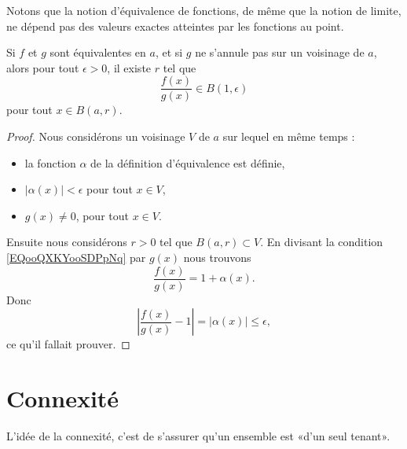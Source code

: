 Notons que la notion d'équivalence de fonctions, de même que la notion de limite, ne dépend pas des valeurs exactes atteintes par les fonctions au point.

\begin{lemma}
    Si \( f\) et \( g\) sont équivalentes en \( a\), et si \( g\) ne s'annule pas sur un voisinage de \( a\), alors pour tout \( \epsilon>0\), il existe \( r\) tel que
    \begin{equation}
        \frac{ f(x) }{ g(x) }\in B(1,\epsilon)
    \end{equation}
    pour tout \( x\in B(a,r)\).
\end{lemma}

\begin{proof}
    Nous considérons un voisinage \( V\) de \( a\) sur lequel en même temps :
    \begin{itemize}
        \item 
            la fonction \( \alpha\) de la définition d'équivalence est définie,
        \item
            \( | \alpha(x) |<\epsilon\) pour tout \( x\in V\),
        \item
            \( g(x)\neq 0\), pour tout \( x\in V\).
    \end{itemize}
    Ensuite nous considérons \( r>0\) tel que \( B(a,r)\subset V\). En divisant la condition \eqref{EQooQXKYooSDPpNq} par \( g(x)\) nous trouvons
    \begin{equation}
        \frac{ f(x) }{ g(x) }=1+\alpha(x).
    \end{equation}
    Donc
    \begin{equation}
        | \frac{ f(x) }{ g(x) }-1 |=| \alpha(x) |\leq \epsilon,
    \end{equation}
    ce qu'il fallait prouver.
\end{proof}


\section{Connexité}

L'idée de la connexité, c'est de s'assurer qu'un ensemble est «d'un seul tenant».

